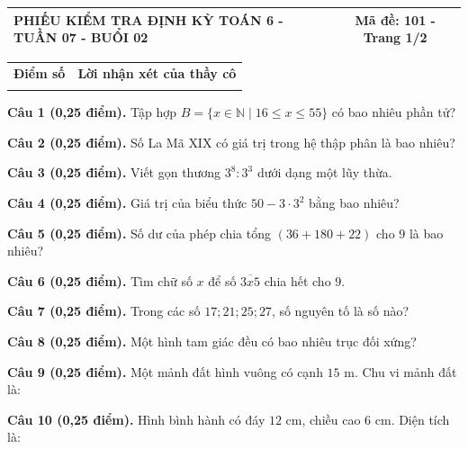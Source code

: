 \documentclass[12pt,a4paper]{article}
\begin{document}
\pagestyle{empty}
\noindent
\begin{tabularx}{\linewidth}{|X|c|}
\hline
\textbf{PHIẾU KIỂM TRA ĐỊNH KỲ TOÁN 6 - TUẦN 07 - BUỔI 02} & \textbf{Mã đề: 101 - Trang 1/2} \\
\hline
\end{tabularx}

\vspace{1.2mm}

\noindent
\begin{tabularx}{\linewidth}{|p{3.2cm}|X|}
\hline
\centering\textbf{Điểm số} & \centering\textbf{Lời nhận xét của thầy cô} \tabularnewline
\rule{0pt}{1.8cm} & \\
\hline
\end{tabularx}

\vspace{1.2mm}

\noindent\textbf{Câu 1 (0,25 điểm).} Tập hợp $B = \{x \in \mathbb{N} \mid 16 \le x \le 55\}$ có bao nhiêu phần tử? \par\vspace{0.3mm}
\noindent\textbf{Câu 2 (0,25 điểm).} Số La Mã $\text{XIX}$ có giá trị trong hệ thập phân là bao nhiêu? \par\vspace{0.3mm}
\noindent\textbf{Câu 3 (0,25 điểm).} Viết gọn thương $3^8 : 3^3$ dưới dạng một lũy thừa. \par\vspace{0.3mm}
\noindent\textbf{Câu 4 (0,25 điểm).} Giá trị của biểu thức $50 - 3 \cdot 3^2$ bằng bao nhiêu? \par\vspace{0.3mm}
\noindent\textbf{Câu 5 (0,25 điểm).} Số dư của phép chia tổng $(36 + 180 + 22)$ cho $9$ là bao nhiêu? \par\vspace{0.3mm}
\noindent\textbf{Câu 6 (0,25 điểm).} Tìm chữ số $x$ để số $\overline{3x5}$ chia hết cho $9$. \par\vspace{0.3mm}
\noindent\textbf{Câu 7 (0,25 điểm).} Trong các số $17; 21; 25; 27$, số nguyên tố là số nào? \par\vspace{0.3mm}
\noindent\textbf{Câu 8 (0,25 điểm).} Một hình tam giác đều có bao nhiêu trục đối xứng? \par\vspace{0.3mm}
\noindent\textbf{Câu 9 (0,25 điểm).} Một mảnh đất hình vuông có cạnh $15\text{ m}$. Chu vi mảnh đất là: \par\vspace{0.3mm}
\noindent\textbf{Câu 10 (0,25 điểm).} Hình bình hành có đáy $12\text{ cm}$, chiều cao $6\text{ cm}$. Diện tích là: \par\vspace{0.3mm}
\end{document}
